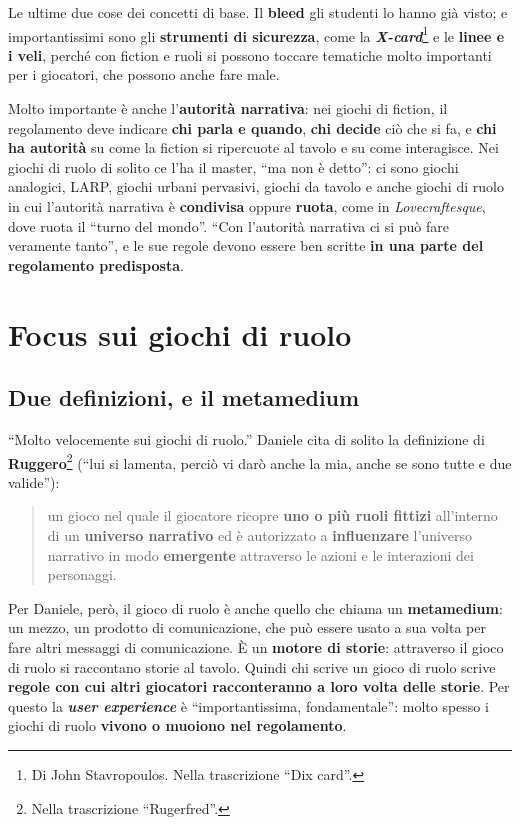 Le ultime due cose dei concetti di base. Il \textbf{bleed} gli studenti lo hanno già visto; e
importantissimi sono gli \textbf{strumenti di sicurezza}, come la \textbf{\emph{X-card}}\footnote{Di
John Stavropoulos. Nella trascrizione ``Dix card''.} e le \textbf{linee e i veli}, perché con fiction
e ruoli si possono toccare tematiche molto importanti per i giocatori, che possono anche fare male.

Molto importante è anche l'\textbf{autorità narrativa}: nei giochi di fiction, il regolamento deve
indicare \textbf{chi parla e quando}, \textbf{chi decide} ciò che si fa, e \textbf{chi ha autorità}
su come la fiction si ripercuote al tavolo e su come interagisce. Nei giochi di ruolo di solito ce
l'ha il master, ``ma non è detto'': ci sono giochi analogici, LARP, giochi urbani pervasivi, giochi
da tavolo e anche giochi di ruolo in cui l'autorità narrativa è \textbf{condivisa} oppure
\textbf{ruota}, come in \emph{Lovecraftesque}, dove ruota il ``turno del mondo''. ``Con l'autorità
narrativa ci si può fare veramente tanto'', e le sue regole devono essere ben scritte \textbf{in una
parte del regolamento predisposta}.

\section{Focus sui giochi di ruolo}
\label{a16:sec:gdr}

\subsection{Due definizioni, e il metamedium}

``Molto velocemente sui giochi di ruolo.'' Daniele cita di solito la definizione di
\textbf{Ruggero}\footnote{Nella trascrizione ``Rugerfred''.} (``lui si lamenta, perciò vi darò anche
la mia, anche se sono tutte e due valide''):
\begin{quote}
un gioco nel quale il giocatore ricopre \textbf{uno o più ruoli fittizi} all'interno di un
\textbf{universo narrativo} ed è autorizzato a \textbf{influenzare} l'universo narrativo in modo
\textbf{emergente} attraverso le azioni e le interazioni dei personaggi.
\end{quote}
Per Daniele, però, il gioco di ruolo è anche quello che chiama un \textbf{metamedium}: un mezzo, un
prodotto di comunicazione, che può essere usato a sua volta per fare altri messaggi di
comunicazione. È un \textbf{motore di storie}: attraverso il gioco di ruolo si raccontano storie al
tavolo. Quindi chi scrive un gioco di ruolo scrive \textbf{regole con cui altri giocatori
racconteranno a loro volta delle storie}. Per questo la \textbf{\emph{user experience}} è
``importantissima, fondamentale'': molto spesso i giochi di ruolo \textbf{vivono o muoiono nel
regolamento}.

